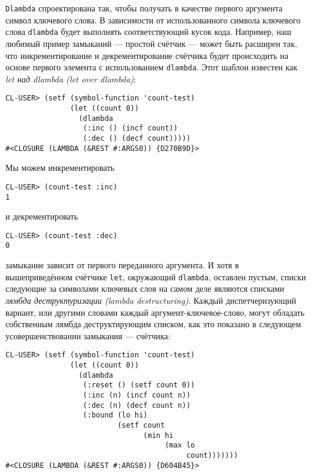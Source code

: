 \verb"Dlambda" спроектирована так, чтобы получать в качестве первого аргумента символ ключевого слова. В зависимости от использованного символа ключевого слова \verb"dlambda" будет выполнять соответствующий кусок кода. Например, наш любимый пример замыканий --- простой счётчик --- может быть расширен так, что инкрементирование и декрементирование счётчика будет происходить на основе первого элемента с использованием \verb"dlambda". Этот шаблон известен как \emph{let над dlambda (let over dlambda)}:

\begin{verbatim}
CL-USER> (setf (symbol-function 'count-test)
               (let ((count 0))
                 (dlambda
                  (:inc () (incf count))
                  (:dec () (decf count)))))
#<CLOSURE (LAMBDA (&REST #:ARGS0)) {D270B9D}>
\end{verbatim}

Мы можем инкрементировать

\begin{verbatim}
CL-USER> (count-test :inc)
1
\end{verbatim}

и декрементировать

\begin{verbatim}
CL-USER> (count-test :dec)
0
\end{verbatim}

замыкание зависит от первого переданного аргумента. И хотя в вышеприведённом счётчике \verb"let", окружающий \verb"dlambda", оставлен пустым, списки следующие за символами ключевых слов на самом деле являются списками \emph{лямбда деструктуризации (lambda destructuring)}. Каждый диспетчеризующий вариант, или другими словами каждый аргумент-ключевое-слово, могут обладать собственным лямбда деструктирующим списком, как это показано в следующем усовершенствовании замыкания --- счётчика:

\begin{verbatim}
CL-USER> (setf (symbol-function 'count-test)
               (let ((count 0))
                 (dlambda
                  (:reset () (setf count 0))
                  (:inc (n) (incf count n))
                  (:dec (n) (decf count n))
                  (:bound (lo hi)
                          (setf count
                                (min hi
                                     (max lo
                                          count)))))))
#<CLOSURE (LAMBDA (&REST #:ARGS0)) {D604B45}>
\end{verbatim}

